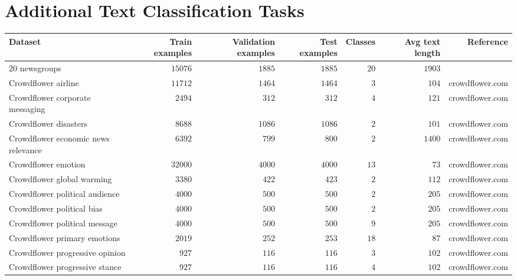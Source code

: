 
\clearpage

\appendix
\onecolumn


\section{Additional Text Classification Tasks}
\label{appendix:hub_stats}


\begin{table}[ht]
\centering
\begin{adjustbox}{max width=\textwidth}
\begin{tabular}{l|rrrrrr}
\toprule
Dataset & Train examples & Validation examples & Test examples & Classes & Avg text length & Reference \\
\midrule
20 newsgroups & $15076$ & $1885$ & $1885$ & $20$ & $1903$ & \citep{Lang95} \\
Crowdflower airline & $11712$ & $1464$ & $1464$ & $3$ & $104$ & crowdflower.com \\
Crowdflower corporate messaging & $2494$ & $312$ & $312$ & $4$ & $121$ & crowdflower.com \\
Crowdflower disasters & $8688$ & $1086$ & $1086$ & $2$ & $101$ & crowdflower.com \\
Crowdflower economic news relevance & $6392$ & $799$ & $800$ & $2$ & $1400$ & crowdflower.com \\
Crowdflower emotion & $32000$ & $4000$ & $4000$ & $13$ & $73$ & crowdflower.com \\
Crowdflower global warming & $3380$ & $422$ & $423$ & $2$ & $112$ & crowdflower.com \\
Crowdflower political audience & $4000$ & $500$ & $500$ & $2$ & $205$ & crowdflower.com \\
Crowdflower political bias & $4000$ & $500$ & $500$ & $2$ & $205$ & crowdflower.com \\
Crowdflower political message & $4000$ & $500$ & $500$ & $9$ & $205$ & crowdflower.com \\
Crowdflower primary emotions & $2019$ & $252$ & $253$ & $18$ & $87$ & crowdflower.com \\
Crowdflower progressive opinion & $927$ & $116$ & $116$ & $3$ & $102$ & crowdflower.com \\
Crowdflower progressive stance & $927$ & $116$ & $116$ & $4$ & $102$ & crowdflower.com \\

\end{tabular}
\end{adjustbox}
\end{table}
